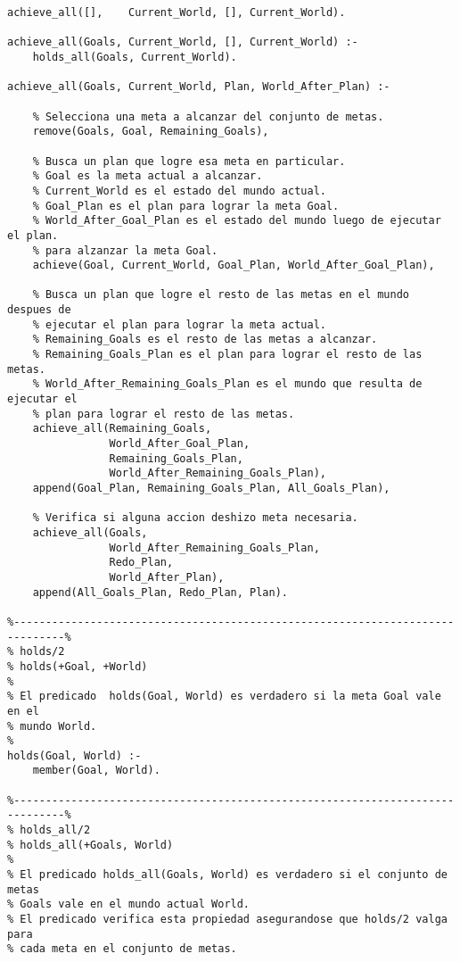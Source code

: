 \documentclass[a4paper,12pt]{report}
\begin{document}
\begin{footnotesize}
\begin{verbatim}
achieve_all([],    Current_World, [], Current_World).

achieve_all(Goals, Current_World, [], Current_World) :-
    holds_all(Goals, Current_World).

achieve_all(Goals, Current_World, Plan, World_After_Plan) :-

    % Selecciona una meta a alcanzar del conjunto de metas.
    remove(Goals, Goal, Remaining_Goals),

    % Busca un plan que logre esa meta en particular.                                                                                                                                                        
    % Goal es la meta actual a alcanzar.
    % Current_World es el estado del mundo actual.
    % Goal_Plan es el plan para lograr la meta Goal.
    % World_After_Goal_Plan es el estado del mundo luego de ejecutar el plan.
    % para alzanzar la meta Goal.
    achieve(Goal, Current_World, Goal_Plan, World_After_Goal_Plan), 

    % Busca un plan que logre el resto de las metas en el mundo despues de 
    % ejecutar el plan para lograr la meta actual. 
    % Remaining_Goals es el resto de las metas a alcanzar.
    % Remaining_Goals_Plan es el plan para lograr el resto de las metas. 
    % World_After_Remaining_Goals_Plan es el mundo que resulta de ejecutar el 
    % plan para lograr el resto de las metas. 
    achieve_all(Remaining_Goals, 
                World_After_Goal_Plan, 
                Remaining_Goals_Plan, 
                World_After_Remaining_Goals_Plan),
    append(Goal_Plan, Remaining_Goals_Plan, All_Goals_Plan),

    % Verifica si alguna accion deshizo meta necesaria.
    achieve_all(Goals, 
                World_After_Remaining_Goals_Plan, 
                Redo_Plan, 
                World_After_Plan),
    append(All_Goals_Plan, Redo_Plan, Plan).

%------------------------------------------------------------------------------%
% holds/2 
% holds(+Goal, +World)
%
% El predicado  holds(Goal, World) es verdadero si la meta Goal vale en el 
% mundo World.
%
holds(Goal, World) :- 
    member(Goal, World).

%------------------------------------------------------------------------------%
% holds_all/2
% holds_all(+Goals, World)
%
% El predicado holds_all(Goals, World) es verdadero si el conjunto de metas
% Goals vale en el mundo actual World. 
% El predicado verifica esta propiedad asegurandose que holds/2 valga para
% cada meta en el conjunto de metas. 


\end{verbatim}
\end{footnotesize}
\end{document}
